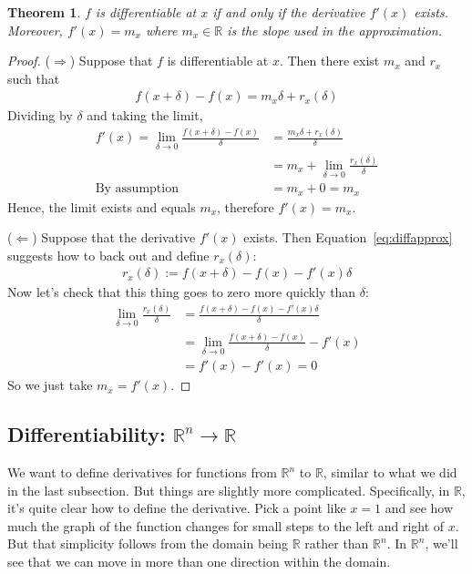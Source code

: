 \documentclass[12pt]{book}
\numberwithin{equation}{section} %
\theoremstyle{plain}
\newtheorem{thm}{Theorem}[section]
\theoremstyle{definition}
\theoremstyle{remark}
\newcommand{\R}{\mathbb{R}}
\newcommand{\Rn}{\mathbb{R}^n}
\begin{document}
\begin{thm}
$f$ is differentiable at $x$ if and only if the derivative $f'(x)$
exists. Moreover, $f'(x)=m_x$ where $m_x\in\R$ is the slope used in the
approximation.
\end{thm}
\begin{proof}
($\Rightarrow$) Suppose that $f$ is differentiable at $x$. Then there
exist $m_x$ and $r_x$ such that
\begin{align*}
  f(x+\delta)-f(x) = m_x\delta + r_x(\delta)
\end{align*}
Dividing by $\delta$ and taking the limit,
\begin{align*}
  f'(x)=\lim_{\delta\rightarrow 0}
  \frac{f(x+\delta)-f(x)}{\delta}
  &= \frac{m_x\delta + r_x(\delta)}{\delta}\\
  &= m_x + \lim_{\delta\rightarrow 0} \frac{r_x(\delta)}{\delta}\\
  \text{By assumption}\quad
  &= m_x + 0 = m_x
\end{align*}
Hence, the limit exists and equals $m_x$, therefore $f'(x)=m_x$.


($\Leftarrow$) Suppose that the derivative $f'(x)$ exists.  Then
Equation~\ref{eq:diffapprox} suggests how to back out and define
$r_x(\delta)$:
\begin{align*}
  r_x(\delta) := f(x+\delta)-f(x) - f'(x)\delta
\end{align*}
Now let's check that this thing goes to zero more quickly than $\delta$:
\begin{align*}
  \lim_{\delta\rightarrow 0}
  \frac{r_x(\delta)}{\delta}
  &=
  \frac{f(x+\delta)-f(x) - f'(x)\delta}{\delta}\\
  &=
  \lim_{\delta\rightarrow 0}
  \frac{f(x+\delta)-f(x)}{\delta}
  -f'(x) \\
  &= f'(x) -f'(x)=0
\end{align*}
So we just take $m_x=f'(x)$.
\end{proof}

\subsection{Differentiability: $\Rn\rightarrow\R$}


We want to define derivatives for functions from $\Rn$ to $\R$, similar
to what we did in the last subsection. But things are slightly more
complicated.  Specifically, in $\R$, it's quite clear how to define the
derivative. Pick a point like $x=1$ and see how much the graph of the
function changes for small steps to the left and right of $x$. But that
simplicity follows from the domain being $\R$ rather than $\Rn$. In
$\Rn$, we'll see that we can move in more than one direction within the
domain.
\end{document}
